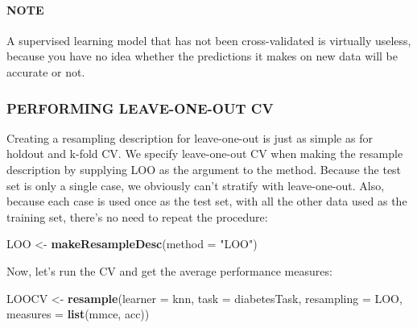 \documentclass[
]{article}
\newenvironment{Shaded}{\begin{snugshade}}{\end{snugshade}}
\newcommand{\AttributeTok}[1]{\textcolor[rgb]{0.13,0.29,0.53}{#1}}
\newcommand{\FunctionTok}[1]{\textcolor[rgb]{0.13,0.29,0.53}{\textbf{#1}}}
\newcommand{\NormalTok}[1]{#1}
\newcommand{\OtherTok}[1]{\textcolor[rgb]{0.56,0.35,0.01}{#1}}
\newcommand{\SpecialCharTok}[1]{\textcolor[rgb]{0.81,0.36,0.00}{\textbf{#1}}}
\newcommand{\StringTok}[1]{\textcolor[rgb]{0.31,0.60,0.02}{#1}}
\begin{document}
\paragraph{NOTE}\label{note-4}

A supervised learning model that has not been cross-validated is
virtually useless, because you have no idea whether the predictions it
makes on new data will be accurate or not.

\subsubsection{PERFORMING LEAVE-ONE-OUT
CV}\label{performing-leave-one-out-cv}

Creating a resampling description for leave-one-out is just as simple as
for holdout and k-fold CV. We specify leave-one-out CV when making the
resample description by supplying LOO as the argument to the method.
Because the test set is only a single case, we obviously can't stratify
with leave-one-out. Also, because each case is used once as the test
set, with all the other data used as the training set, there's no need
to repeat the procedure:

\begin{Shaded}
\begin{Highlighting}[]
\NormalTok{LOO }\OtherTok{\textless{}{-}} \FunctionTok{makeResampleDesc}\NormalTok{(}\AttributeTok{method =} \StringTok{"LOO"}\NormalTok{)}
\end{Highlighting}
\end{Shaded}

Now, let's run the CV and get the average performance measures:

\begin{Shaded}
\begin{Highlighting}[]
\NormalTok{LOOCV }\OtherTok{\textless{}{-}} \FunctionTok{resample}\NormalTok{(}\AttributeTok{learner =}\NormalTok{ knn, }\AttributeTok{task =}\NormalTok{ diabetesTask, }\AttributeTok{resampling =}\NormalTok{ LOO,}
                  \AttributeTok{measures =} \FunctionTok{list}\NormalTok{(mmce, acc))}
\end{Highlighting}
\end{Shaded}

\begin{Shaded}
\end{Shaded}
\end{document}
